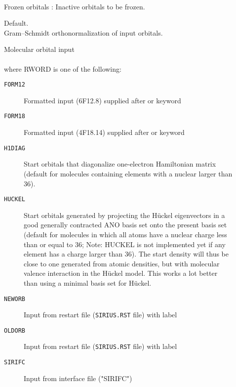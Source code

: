 \begin{description}
\item[]
   \\
  Frozen orbitals : Inactive orbitals to be frozen.

\item[]
  Default.\\
  Gram--Schmidt orthonormalization of input orbitals.

\item[]
   Molecular orbital input\\
    \\
   where RWORD is one of the following:
   \begin{description}
   \item[{\tt FORM12\ }] Formatted input (6F12.8)  supplied after
         or  keyword
   \item[{\tt FORM18\ }] Formatted input (4F18.14) supplied after
         or  keyword
   \item[{\tt H1DIAG\ }] Start orbitals that diagonalize
        one-electron Hamiltonian matrix (default
        for molecules containing elements with a nuclear larger than 36).
   \item[{\tt HUCKEL\ }] Start orbitals generated by projecting the
        H{\"u}ckel eigenvectors in a good generally contracted ANO basis set
        onto the present basis set
        (default for molecules in which all atoms have a nuclear charge less than
        or equal to 36; Note: HUCKEL is not implemented yet if any element has a
        charge larger than 36).
        The start density will thus be close to one generated from atomic densities,
        but with molecular valence interaction in the H{\"u}ckel model.
        This works a lot better than using a minimal basis set for H{\"u}ckel.
   \item[{\tt NEWORB\ }] Input from {\sir} restart file
                            (\verb|SIRIUS.RST| file) with label 
   \item[{\tt OLDORB\ }] Input from {\sir} restart file
                            (\verb|SIRIUS.RST| file) with label 
   \item[{\tt SIRIFC\ }] Input from {\sir} interface file ("SIRIFC")
   \end{description}


\end{description}

